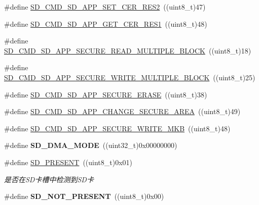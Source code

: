 \begin{DoxyCompactItemize}
\item 
\#define \hyperlink{group__sd__card_ga6775fd69fe0e739c7464951bd6aacdf1}{S\+D\+\_\+\+C\+M\+D\+\_\+\+S\+D\+\_\+\+A\+P\+P\+\_\+\+S\+E\+T\+\_\+\+C\+E\+R\+\_\+\+R\+E\+S2}~((uint8\+\_\+t)47)
\item 
\#define \hyperlink{group__sd__card_ga0f39072d4c981331dfc1956c09d8a72c}{S\+D\+\_\+\+C\+M\+D\+\_\+\+S\+D\+\_\+\+A\+P\+P\+\_\+\+G\+E\+T\+\_\+\+C\+E\+R\+\_\+\+R\+E\+S1}~((uint8\+\_\+t)48)
\item 
\#define \hyperlink{group__sd__card_ga7f4041b0d212f2d5d3f725b0beb97f0e}{S\+D\+\_\+\+C\+M\+D\+\_\+\+S\+D\+\_\+\+A\+P\+P\+\_\+\+S\+E\+C\+U\+R\+E\+\_\+\+R\+E\+A\+D\+\_\+\+M\+U\+L\+T\+I\+P\+L\+E\+\_\+\+B\+L\+O\+CK}~((uint8\+\_\+t)18)
\item 
\#define \hyperlink{group__sd__card_ga97cfaea6d5d8646eda4e40b5e0bcbf94}{S\+D\+\_\+\+C\+M\+D\+\_\+\+S\+D\+\_\+\+A\+P\+P\+\_\+\+S\+E\+C\+U\+R\+E\+\_\+\+W\+R\+I\+T\+E\+\_\+\+M\+U\+L\+T\+I\+P\+L\+E\+\_\+\+B\+L\+O\+CK}~((uint8\+\_\+t)25)
\item 
\#define \hyperlink{group__sd__card_ga60d30f8255fe89e8d1c4aaabb4f3a60f}{S\+D\+\_\+\+C\+M\+D\+\_\+\+S\+D\+\_\+\+A\+P\+P\+\_\+\+S\+E\+C\+U\+R\+E\+\_\+\+E\+R\+A\+SE}~((uint8\+\_\+t)38)
\item 
\#define \hyperlink{group__sd__card_ga15e57ba63b8da2bf43d0205efd532b89}{S\+D\+\_\+\+C\+M\+D\+\_\+\+S\+D\+\_\+\+A\+P\+P\+\_\+\+C\+H\+A\+N\+G\+E\+\_\+\+S\+E\+C\+U\+R\+E\+\_\+\+A\+R\+EA}~((uint8\+\_\+t)49)
\item 
\#define \hyperlink{group__sd__card_ga025052e51318ae13855774c1acf04ee2}{S\+D\+\_\+\+C\+M\+D\+\_\+\+S\+D\+\_\+\+A\+P\+P\+\_\+\+S\+E\+C\+U\+R\+E\+\_\+\+W\+R\+I\+T\+E\+\_\+\+M\+KB}~((uint8\+\_\+t)48)
\item 
\#define {\bfseries S\+D\+\_\+\+D\+M\+A\+\_\+\+M\+O\+DE}~((uint32\+\_\+t)0x00000000)\hypertarget{group__sd__card_gad3f9516a5e6764baf2083f76f4bc0eea}{}\label{group__sd__card_gad3f9516a5e6764baf2083f76f4bc0eea}

\item 
\#define \hyperlink{group__sd__card_ga44beec2a536fb750d2401d7bb7c227b6}{S\+D\+\_\+\+P\+R\+E\+S\+E\+NT}~((uint8\+\_\+t)0x01)\hypertarget{group__sd__card_ga44beec2a536fb750d2401d7bb7c227b6}{}\label{group__sd__card_ga44beec2a536fb750d2401d7bb7c227b6}

\begin{DoxyCompactList}\small\item\em 是否在\+S\+D卡槽中检测到\+S\+D卡 \end{DoxyCompactList}\item 
\#define {\bfseries S\+D\+\_\+\+N\+O\+T\+\_\+\+P\+R\+E\+S\+E\+NT}~((uint8\+\_\+t)0x00)\hypertarget{group__sd__card_ga342b72a630b1c5c90e2fd95c93dd686b}{}\label{group__sd__card_ga342b72a630b1c5c90e2fd95c93dd686b}


\end{DoxyCompactItemize}
